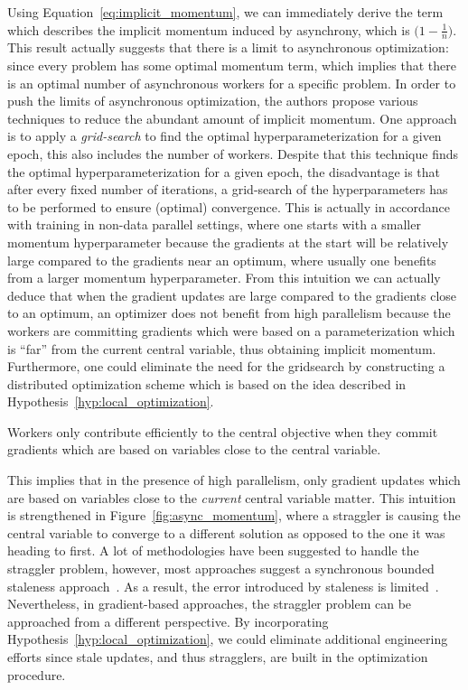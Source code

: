Using Equation~\ref{eq:implicit_momentum}, we can immediately derive the term which describes the implicit momentum induced by asynchrony, which is $\big(1 - \frac{1}{n}\big)$. This result actually suggests that there is a limit to asynchronous optimization: since every problem has some optimal momentum term, which implies that there is an optimal number of asynchronous workers for a specific problem. In order to push the limits of asynchronous optimization, the authors propose various techniques to reduce the abundant amount of implicit momentum. One approach is to apply a \emph{grid-search} to find the optimal hyperparameterization for a given epoch, this also includes the number of workers. Despite that this technique finds the optimal hyperparameterization for a given epoch, the disadvantage is that after every fixed number of iterations, a grid-search of the hyperparameters has to be performed to ensure (optimal) convergence. This is actually in accordance with training in non-data parallel settings, where one starts with a smaller momentum hyperparameter because the gradients at the start will be relatively large compared to the gradients near an optimum, where usually one benefits from a larger momentum hyperparameter. From this intuition we can actually deduce that when the gradient updates are large compared to the gradients close to an optimum, an optimizer does not benefit from high parallelism because the workers are committing gradients which were based on a parameterization which is ``far'' from the current central variable, thus obtaining implicit momentum. Furthermore, one could eliminate the need for the gridsearch by constructing a distributed optimization scheme which is based on the idea described in Hypothesis~\ref{hyp:local_optimization}.

\begin{hyp} \label{hyp:local_optimization}
  Workers only contribute efficiently to the central objective when they commit gradients which are based on variables close to the central variable.
\end{hyp}

This implies that in the presence of high parallelism, only gradient updates which are based on variables close to the \emph{current} central variable matter. This intuition is strengthened in Figure~\ref{fig:async_momentum}, where a straggler is causing the central variable to converge to a different solution as opposed to the one it was heading to first. A lot of methodologies have been suggested to handle the straggler problem, however, most approaches suggest a synchronous bounded staleness approach~\cite{cipar2013solving, ho2013more}. As a result, the error introduced by staleness is limited~\cite{ho2013more}. Nevertheless, in gradient-based approaches, the straggler problem can be approached from a different perspective. By incorporating Hypothesis~\ref{hyp:local_optimization}, we could eliminate additional engineering efforts since stale updates, and thus stragglers, are built in the optimization procedure.

